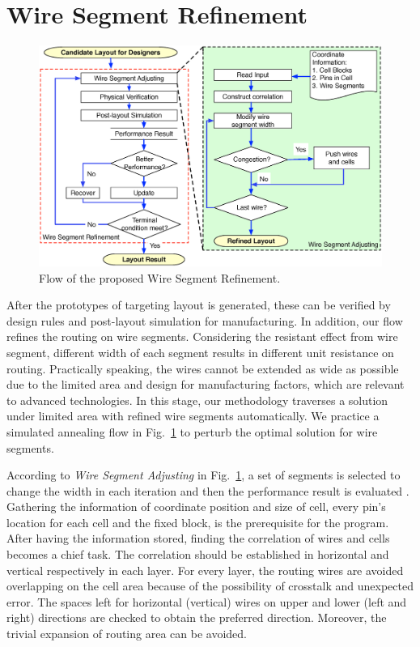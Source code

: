   \section{Wire Segment Refinement}\label{sec:WSR}

    \begin{figure}[t]
      \centering
      \includegraphics[width=\textwidth]{Fig/Chapter4/WireSegRefine.eps}
      \caption{Flow of the proposed Wire Segment Refinement.}
      \label{fig:WireSegRefine}
    \end{figure}
    
      


    After the prototypes of targeting layout is generated, these can be verified by design rules and post-layout simulation for manufacturing. In addition, our flow refines the routing on wire segments. Considering the resistant effect from wire segment, different width of each segment results in different unit resistance on routing. Practically speaking, the wires cannot be extended as wide as possible due to the limited area and design for manufacturing factors, which are relevant to advanced technologies. In this stage, our methodology traverses a solution under limited area with refined wire segments automatically. We practice a simulated annealing flow in Fig.~\ref{fig:WireSegRefine} to perturb the optimal solution for wire segments.

    
    

    According to {\it Wire Segment Adjusting} in Fig.~\ref{fig:WireSegRefine}, a set of segments is selected to change the width in each iteration and then the performance result is evaluated . Gathering the information of coordinate position and size of cell, every pin's location for each cell and the fixed block, is the prerequisite for the program. After having the information stored, finding the correlation of wires and cells becomes a chief task. The correlation should be established in horizontal and vertical respectively in each layer. For every layer, the routing wires are avoided overlapping on the cell area because of the possibility of crosstalk and unexpected error. The spaces left for horizontal (vertical) wires on upper and lower (left and right) directions are checked to obtain the preferred direction. Moreover, the trivial expansion of routing area can be avoided. 


